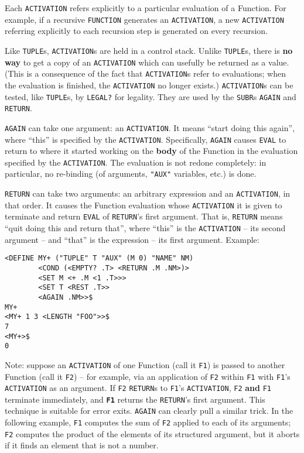 \documentclass[a4paper,]{article}
\begin{document}
Each \texttt{ACTIVATION} refers explicitly to a particular evaluation of a Function. For example, if a recursive
\texttt{FUNCTION} generates an \texttt{ACTIVATION}, a new \texttt{ACTIVATION} referring explicitly to each recursion step
is generated on every recursion.

Like \texttt{TUPLE}s, \texttt{ACTIVATION}s are held in a control stack. Unlike \texttt{TUPLE}s, there is \textbf{no way} to
get a copy of an \texttt{ACTIVATION} which can usefully be returned as a value. (This is a consequence of the fact that
\texttt{ACTIVATION}s refer to evaluations; when the evaluation is finished, the \texttt{ACTIVATION} no longer exists.)
\texttt{ACTIVATION}s can be tested, like \texttt{TUPLE}s, by \texttt{LEGAL?} for legality. They are
used by the \texttt{SUBR}s \texttt{AGAIN} and \texttt{RETURN}.

\texttt{AGAIN} can take one argument: an \texttt{ACTIVATION}. It means ``start doing this again'', where ``this'' is
specified by the \texttt{ACTIVATION}. Specifically, \texttt{AGAIN} causes \texttt{EVAL} to return to where it started
working on the \textbf{body} of the Function in the evaluation specified by the \texttt{ACTIVATION}. The evaluation is not
redone completely: in particular, no re-binding (of arguments, \texttt{"AUX"} variables, etc.) is done.

 \texttt{RETURN} can take two arguments: an arbitrary expression and an \texttt{ACTIVATION},
in that order. It causes the Function evaluation whose \texttt{ACTIVATION} it is given to terminate and return
\texttt{EVAL} of \texttt{RETURN}'s first argument. That is, \texttt{RETURN} means ``quit doing this and return that'',
where ``this'' is the \texttt{ACTIVATION} -- its second argument -- and ``that'' is the expression -- its first argument.
Example:

\begin{verbatim}
<DEFINE MY+ ("TUPLE" T "AUX" (M 0) "NAME" NM)
        <COND (<EMPTY? .T> <RETURN .M .NM>)>
        <SET M <+ .M <1 .T>>>
        <SET T <REST .T>>
        <AGAIN .NM>>$
MY+
<MY+ 1 3 <LENGTH "FOO">>$
7
<MY+>$
0
\end{verbatim}

Note: suppose an \texttt{ACTIVATION} of one Function (call it \texttt{F1}) is passed to another Function (call it
\texttt{F2}) -- for example, via an application of \texttt{F2} within \texttt{F1} with \texttt{F1}'s \texttt{ACTIVATION} as
an argument. If \texttt{F2} \texttt{RETURN}s to \texttt{F1}'s \texttt{ACTIVATION}, \texttt{F2} \textbf{and} \texttt{F1}
terminate immediately, and \textbf{\texttt{F1}} returns the \texttt{RETURN}'s first argument. This technique is suitable
for error exits. \texttt{AGAIN} can clearly pull a similar trick. In the following example, \texttt{F1} computes the sum of
\texttt{F2} applied to each of its arguments; \texttt{F2} computes the product of the elements of its structured argument,
but it aborts if it finds an element that is not a number.
\end{document}
